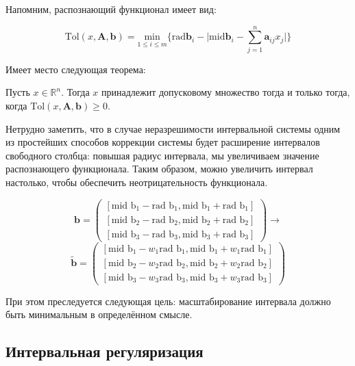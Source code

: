 Напомним, распознающий функционал имеет вид:

\begin{equation}
\textrm{Tol}(x, \mathbf{A}, \mathbf{b}) = \underset{1 \leq i \leq m}{\textrm{min}} \bigg \lbrace \textrm{rad} \mathbf{b}_i - \bigg| \textrm{mid} \mathbf{b}_i - \sum_{j=1}^{n} \mathbf{a}_{ij}x_j \bigg|  \bigg \rbrace
\end{equation}

Имеет место следующая теорема:

\begin{theorem}
	Пусть $x \in \mathbb{R}^n$. Тогда $x$ принадлежит допусковому множество тогда и только тогда, когда $\textrm{Tol}(x, \mathbf{A}, \mathbf{b}) \geq 0$.
\end{theorem}

Нетрудно заметить, что в случае неразрешимости интервальной системы одним из простейших способов коррекции системы будет расширение интервалов свободного столбца: повышая радиус интервала, мы увеличиваем значение распознающего функционала. Таким образом, можно увеличить интервал настолько, чтобы обеспечить неотрицательность функционала.

\begin{equation*}
\mathbf{b}=
\begin{pmatrix}
[\textrm{mid b}_1 - \textrm{rad b}_1, \textrm{mid b}_1 + \textrm{rad b}_1] \\
[\textrm{mid b}_2 - \textrm{rad b}_2, \textrm{mid b}_2 + \textrm{rad b}_2] \\
[\textrm{mid b}_3 - \textrm{rad b}_3, \textrm{mid b}_3 + \textrm{rad b}_3]
\end{pmatrix}
\rightarrow
\end{equation*}
\begin{equation*}
\tilde{\mathbf{b}}=
\begin{pmatrix}
[\textrm{mid b}_1 - w_1 \textrm{rad b}_1, \textrm{mid b}_1 + w_1 \textrm{rad b}_1] \\
[\textrm{mid b}_2 - w_2 \textrm{rad b}_2, \textrm{mid b}_2 + w_2 \textrm{rad b}_2] \\
[\textrm{mid b}_3 - w_3 \textrm{rad b}_3, \textrm{mid b}_3 + w_3 \textrm{rad b}_3]
\end{pmatrix}
\end{equation*}

При этом преследуется следующая цель: масштабирование интервала должно быть минимальным в определённом смысле.

\subsection{Интервальная регуляризация}

